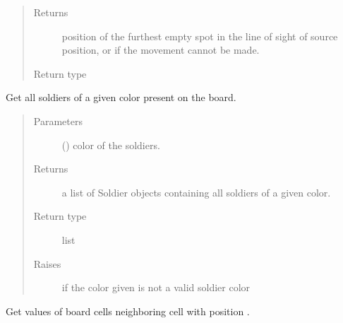 \documentclass[letterpaper,10pt,english]{sphinxmanual}
\begin{document}
\begin{fulllineitems}
\begin{fulllineitems}
\begin{quote}
\begin{description}
\begin{itemize}
\end{itemize}

\item[{Returns}] \leavevmode
position of the furthest empty spot in the line of sight
of source position, or  if the movement cannot be made.

\item[{Return type}] \leavevmode
{\hyperref[\detokenize{util:util.Vec}]{}}

\end{description}\end{quote}

\end{fulllineitems}


\begin{fulllineitems}
\label{\detokenize{neutron:neutron.NeutronBoard.get_soldiers}}
Get all soldiers of a given color present on the board.
\begin{quote}\begin{description}
\item[{Parameters}] \leavevmode
{} () \textendash{} color of the soldiers.

\item[{Returns}] \leavevmode
a list of Soldier objects containing all soldiers of a given color.

\item[{Return type}] \leavevmode
list

\item[{Raises}] \leavevmode
{} \textendash{} if the color given is not a valid soldier color

\end{description}\end{quote}

\end{fulllineitems}


\begin{fulllineitems}
\label{\detokenize{neutron:neutron.NeutronBoard.neighbors}}
Get values of board cells neighboring cell with position .


\end{fulllineitems}
\end{fulllineitems}
\end{document}
